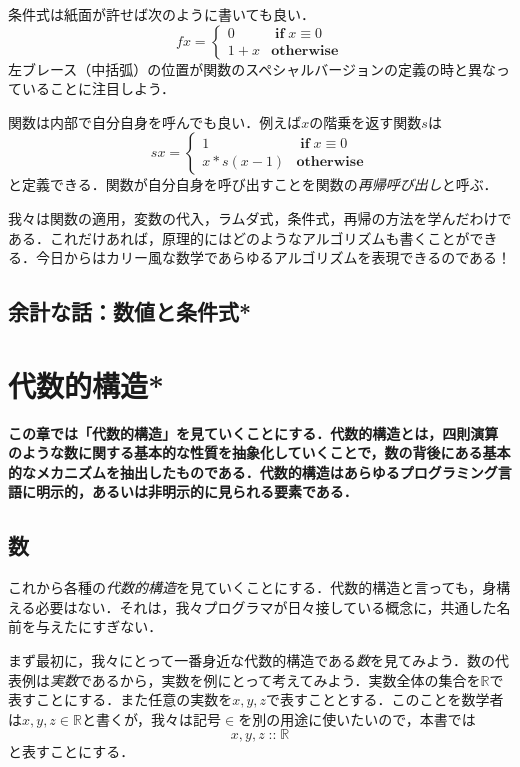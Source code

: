 \documentclass[twocolumn]{jsbook}
\newcommand{\keyword}[1]{{\emph{#1}}}
\newenvironment{leader}{\begingroup\bf}{\endgroup}
\newcommand{\mathKeyword}[1]{\mathbf{#1}}
\DeclareMathOperator{\mathIf}{\mathKeyword{if}}
\DeclareMathOperator{\mathIn}{::}
\newcommand{\mathOtherwise}{\mathKeyword{otherwise}}
\newcommand{\mathSpecialSet}[1]{\mathbb{#1}}
\begin{document}
条件式は紙面が許せば次のように書いても良い．
\begin{equation*}
fx=\begin{cases}
0&\mathIf x\equiv0\\
1+x&\mathOtherwise
\end{cases}
\end{equation*}
左ブレース（中括弧）の位置が関数のスペシャルバージョンの定義の時と異なっていることに注目しよう．

関数は内部で自分自身を呼んでも良い．例えば$x$の階乗を返す関数$s$は
\begin{equation*}
sx=\begin{cases}
1&\mathIf x\equiv0\\
x*s(x-1)&\mathOtherwise
\end{cases}
\end{equation*}
と定義できる．関数が自分自身を呼び出すことを関数の\keyword{再帰呼び出し}と呼ぶ．

我々は関数の適用，変数の代入，ラムダ式，条件式，再帰の方法を学んだわけである．これだけあれば，原理的にはどのようなアルゴリズムも書くことができる．今日からはカリー風な数学であらゆるアルゴリズムを表現できるのである！

\section{余計な話：数値と条件式*}


\chapter{代数的構造*}

\begin{leader}
この章では「代数的構造」を見ていくことにする．代数的構造とは，四則演算のような数に関する基本的な性質を抽象化していくことで，数の背後にある基本的なメカニズムを抽出したものである．代数的構造はあらゆるプログラミング言語に明示的，あるいは非明示的に見られる要素である．
\end{leader}

\section{数}

これから各種の\keyword{代数的構造}を見ていくことにする．代数的構造と言っても，身構える必要はない．それは，我々プログラマが日々接している概念に，共通した名前を与えたにすぎない．

まず最初に，我々にとって一番身近な代数的構造である\keyword{数}を見てみよう．数の代表例は\keyword{実数}であるから，実数を例にとって考えてみよう．実数全体の集合を$\mathSpecialSet{R}$で表すことにする．また任意の実数を$x,y,z$で表すこととする．このことを数学者は$x,y,z\in\mathSpecialSet{R}$と書くが，我々は記号$\in$を別の用途に使いたいので，本書では$$x,y,z\mathIn\mathSpecialSet{R}$$と表すことにする．
\end{document}
